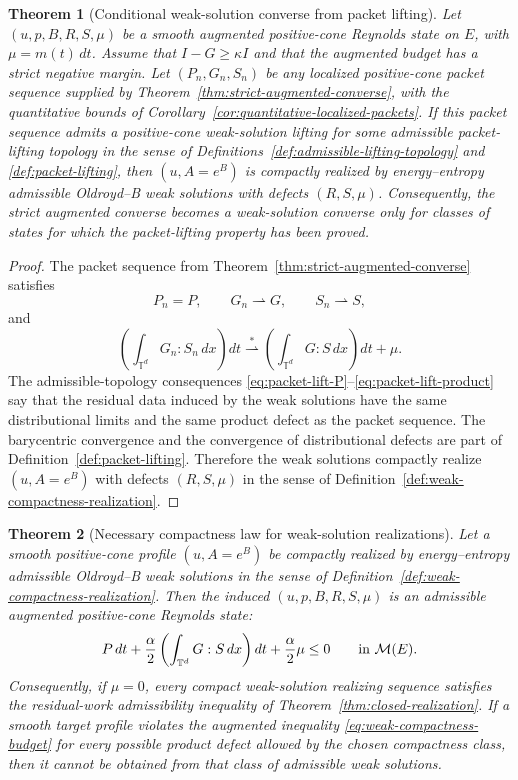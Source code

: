 \documentclass[11pt]{article}
\numberwithin{equation}{section}
\newtheorem{theorem}{Theorem}[section]
\newcommand{\T}{\mathbb T}
\begin{document}
\begin{theorem}[Conditional weak-solution converse from packet lifting]
\label{thm:conditional-full-converse}
Let \((u,p,B,R,S,\mu)\) be a smooth augmented positive-cone Reynolds state on
\(E\), with \(\mu=m(t)\,dt\).  Assume that \(I-G\ge\kappa I\) and that the
augmented budget has a strict negative margin.  Let
\((P_n,G_n,S_n)\) be any localized positive-cone packet sequence supplied by
Theorem~\ref{thm:strict-augmented-converse}, with the quantitative bounds of
Corollary~\ref{cor:quantitative-localized-packets}.  If this packet sequence
admits a positive-cone weak-solution lifting for some admissible
packet-lifting topology in the sense of
Definitions~\ref{def:admissible-lifting-topology} and
\ref{def:packet-lifting}, then \((u,A=e^B)\) is compactly realized
by energy--entropy admissible Oldroyd--B weak solutions with defects
\((R,S,\mu)\).  Consequently, the strict augmented converse becomes a
weak-solution converse only for classes of states for which the packet-lifting
property has been proved.
\end{theorem}

\begin{proof}
The packet sequence from Theorem~\ref{thm:strict-augmented-converse} satisfies
\[
  P_n=P,\qquad
  G_n\rightharpoonup G,\qquad
  S_n\rightharpoonup S,
\]
and
\[
  \left(\int_{\T^d}G_n:S_n\,dx\right)dt
  \stackrel{*}{\rightharpoonup}
  \left(\int_{\T^d}G:S\,dx\right)dt+\mu .
\]
The admissible-topology consequences
\eqref{eq:packet-lift-P}--\eqref{eq:packet-lift-product} say that the residual
data induced by the weak solutions have the same distributional limits and the
same product defect as the packet sequence.  The barycentric convergence and
the convergence of distributional defects are part of
Definition~\ref{def:packet-lifting}.  Therefore the weak solutions compactly
realize \((u,A=e^B)\) with defects \((R,S,\mu)\) in the sense of
Definition~\ref{def:weak-compactness-realization}.
\end{proof}

\begin{theorem}[Necessary compactness law for weak-solution realizations]
\label{thm:weak-compactness-realization}
Let a smooth positive-cone profile \((u,A=e^B)\) be compactly realized by
energy--entropy admissible Oldroyd--B weak solutions in the sense of
Definition~\ref{def:weak-compactness-realization}.  Then the induced
\((u,p,B,R,S,\mu)\) is an admissible augmented positive-cone Reynolds state:
\begin{equation}
  P\,dt+\frac{\alpha}{2}
  \left(\int_{\T^d}G:S\,dx\right)dt
  +\frac{\alpha}{2}\mu\le0
  \qquad\hbox{in }\mathcal M(E).
  \label{eq:weak-compactness-budget}
\end{equation}
Consequently, if \(\mu=0\), every compact weak-solution realizing sequence satisfies
the residual-work admissibility inequality of
Theorem~\ref{thm:closed-realization}.  If a smooth target profile violates the
augmented inequality \eqref{eq:weak-compactness-budget} for every possible
product defect allowed by the chosen compactness class, then it cannot be
obtained from that class of admissible weak solutions.
\end{theorem}
\end{document}
